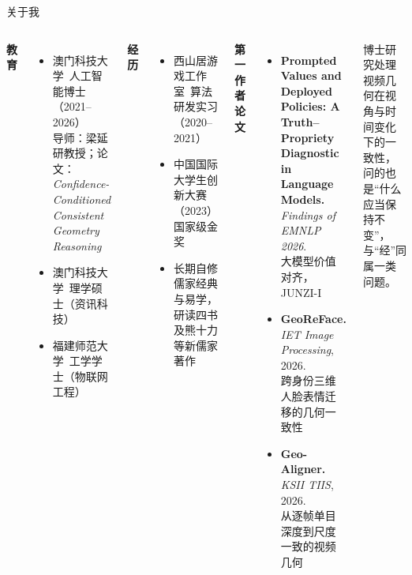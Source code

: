 \documentclass[aspectratio=169,11pt,fontset=fandol]{ctexbeamer}
\newcommand{\hg}[1]{{\bfseries\color{golddeep}#1}}       %
\begin{document}
\begin{frame}[t]{关于我}
\begin{columns}[T,onlytextwidth]
{\hg{教育}}
\begin{itemize}\small\setlength{\itemsep}{1pt}
\item 澳门科技大学\ 人工智能博士（2021–2026）\\{\footnotesize 导师：梁延研教授；论文：\textit{Confidence-Conditioned Consistent Geometry Reasoning}}
\item 澳门科技大学\ 理学硕士（资讯科技）
\item 福建师范大学\ 工学学士（物联网工程）
\end{itemize}
\vspace{3pt}
{\hg{经历}}
\begin{itemize}\small\setlength{\itemsep}{1pt}
\item 西山居游戏工作室\ 算法研发实习（2020–2021）
\item 中国国际大学生创新大赛（2023）国家级金奖
\item 长期自修儒家经典与易学，研读四书及熊十力等新儒家著作
\end{itemize}
{\hg{第一作者论文}}
\begin{itemize}\small\setlength{\itemsep}{3pt}
\item \textbf{Prompted Values and Deployed Policies: A Truth–Propriety Diagnostic in Language Models.} \textit{Findings of EMNLP 2026}.\\{\footnotesize 大模型价值对齐，JUNZI-I}
\item \textbf{GeoReFace.} \textit{IET Image Processing}, 2026.\\{\footnotesize 跨身份三维人脸表情迁移的几何一致性}
\item \textbf{Geo-Aligner.} \textit{KSII TIIS}, 2026.\\{\footnotesize 从逐帧单目深度到尺度一致的视频几何}
\end{itemize}
\vspace{2pt}
\begin{remark}
\small 博士研究处理视频几何在视角与时间变化下的一致性，问的也是“什么应当保持不变”，与“经”同属一类问题。
\end{remark}
\end{columns}
\end{frame}
\end{document}
